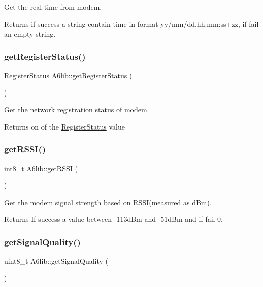Get the real time from modem. \begin{DoxyReturn}{Returns}
if success a string contain time in format yy/mm/dd,hh\+:mm\+:ss+zz, if fail an empty string. 
\end{DoxyReturn}
\mbox{\label{class_a6lib_a7a8beb6c42199ea32f9a73f45f7b500e}} 
\subsubsection{\texorpdfstring{get\+Register\+Status()}{getRegisterStatus()}}
{\footnotesize\ttfamily \mbox{\hyperlink{_a6lib_8h_a0a43f46ad95cebb665a0d371219a6015}{Register\+Status}} A6lib\+::get\+Register\+Status (\begin{DoxyParamCaption}{ }\end{DoxyParamCaption})}

Get the network registration status of modem. \begin{DoxyReturn}{Returns}
on of the \mbox{\hyperlink{_a6lib_8h_a0a43f46ad95cebb665a0d371219a6015}{Register\+Status}} value 
\end{DoxyReturn}
\mbox{\label{class_a6lib_a6cfaf041a05b6d86fbc5c18aa196bd0c}} 
\subsubsection{\texorpdfstring{get\+R\+S\+S\+I()}{getRSSI()}}
{\footnotesize\ttfamily int8\+\_\+t A6lib\+::get\+R\+S\+SI (\begin{DoxyParamCaption}{ }\end{DoxyParamCaption})}

Get the modem signal strength based on R\+S\+S\+I(measured as d\+Bm). \begin{DoxyReturn}{Returns}
If success a value between -\/113d\+Bm and -\/51d\+Bm and if fail 0. 
\end{DoxyReturn}
\mbox{\label{class_a6lib_a90a1e3733155181d56c02f7973066ddf}} 
\subsubsection{\texorpdfstring{get\+Signal\+Quality()}{getSignalQuality()}}
{\footnotesize\ttfamily uint8\+\_\+t A6lib\+::get\+Signal\+Quality (\begin{DoxyParamCaption}{ }\end{DoxyParamCaption})}

